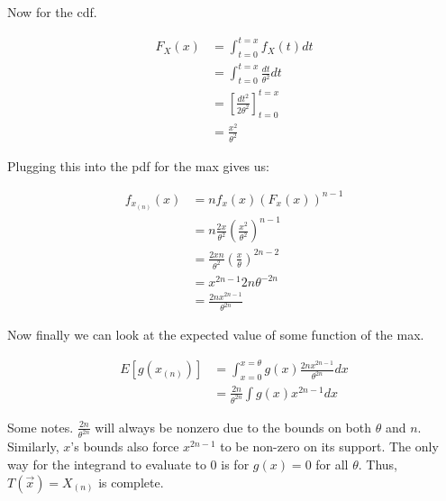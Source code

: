Now for the cdf.

\begin{align*}
	F_X(x) &= \int_{t=0}^{t=x} f_X(t) dt \\
	&= \int_{t=0}^{t=x} \frac{dt}{\theta^2} dt \\
	&= \left[ \frac{dt^2}{2\theta^2} \right]_{t=0}^{t=x} \\
	&= \frac{x^2}{\theta^2}
\end{align*}

Plugging this into the pdf for the max gives us:

\begin{align*}
	f_{x_{(n)}}(x) &= n f_x(x) (F_x(x))^{n-1} \\
	&= n \frac{2x}{\theta^2} \left( \frac{x^2}{\theta^2} \right)^{n-1} \\
	&= \frac{2xn}{\theta^2} \left( \frac{x}{\theta} \right)^{2n-2} \\
	&= x^{2n-1}2n\theta^{-2n} \\
	&= \frac{2nx^{2n-1}}{\theta^{2n}}
\end{align*}

Now finally we can look at the expected value of some function of the max.

\begin{align*}
	E[g(x_{(n)})] &= \int_{x=0}^{x=\theta} g(x) \frac{2nx^{2n-1}}{\theta^{2n}} dx \\
	&= \frac{2n}{\theta^{2n}} \int g(x) x^{2n-1} dx
\end{align*}

Some notes. $\frac{2n}{\theta^{2n}}$ will always be nonzero due to the bounds on both $\theta$ and $n$. Similarly, $x$'s bounds also force $x^{2n-1}$ to be non-zero on its support. The only way for the integrand to evaluate to 0 is for $g(x) = 0$ for all $\theta$. Thus, $T(\vec{x}) = X_{(n)}$ is complete.

